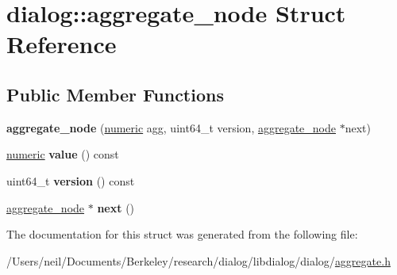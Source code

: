 \hypertarget{structdialog_1_1aggregate__node}{}\section{dialog\+:\+:aggregate\+\_\+node Struct Reference}
\label{structdialog_1_1aggregate__node}
\subsection*{Public Member Functions}
\begin{DoxyCompactItemize}
\item 
\mbox{\label{structdialog_1_1aggregate__node_ac2699ef0f84e64b7c9c858b480051d27}} 
{\bfseries aggregate\+\_\+node} (\hyperlink{classdialog_1_1numeric}{numeric} agg, uint64\+\_\+t version, \hyperlink{structdialog_1_1aggregate__node}{aggregate\+\_\+node} $\ast$next)
\item 
\mbox{\label{structdialog_1_1aggregate__node_ac9ccb233cd07a43cab4430e328a1a97f}} 
\hyperlink{classdialog_1_1numeric}{numeric} {\bfseries value} () const
\item 
\mbox{\label{structdialog_1_1aggregate__node_a850b777f13bbb0f2a12f0502813160c4}} 
uint64\+\_\+t {\bfseries version} () const
\item 
\mbox{\label{structdialog_1_1aggregate__node_a2d98945358e14f96c40b18984574c81c}} 
\hyperlink{structdialog_1_1aggregate__node}{aggregate\+\_\+node} $\ast$ {\bfseries next} ()
\end{DoxyCompactItemize}


The documentation for this struct was generated from the following file\+:\begin{DoxyCompactItemize}
\item 
/\+Users/neil/\+Documents/\+Berkeley/research/dialog/libdialog/dialog/\hyperlink{aggregate_8h}{aggregate.\+h}\end{DoxyCompactItemize}
